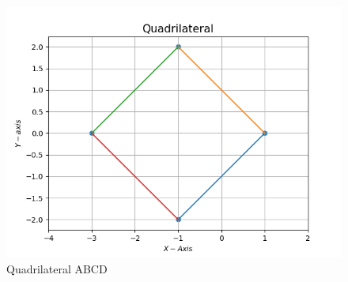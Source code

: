 \documentclass[12pt]{article}
\begin{document}
\begin{figure}[H]
			\centering
			\includegraphics[width=\columnwidth]{figs/Figure_1.png}
			\caption{Quadrilateral ABCD}
			\label{fig:16}
		\end{figure}
\end{document}
